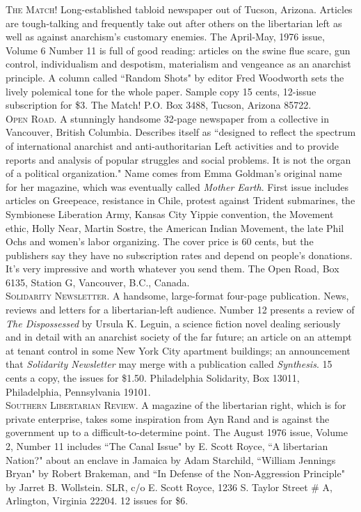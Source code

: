 \noindent\textsc{The Match!} Long-established tabloid newspaper out of Tucson, Arizona. Articles are tough-talking and frequently take out after others on the libertarian left as well as against anarchism's customary enemies. The April-May, 1976 issue, Volume 6 Number 11 is full of good reading: articles on the swine flue scare, gun control, individualism and despotism, materialism and vengeance as an anarchist principle. A column called ``Random Shots" by editor Fred Woodworth sets the lively polemical tone for the whole paper. Sample copy 15 cents, 12-issue subscription for \$3. The Match! P.O. Box 3488, Tucson, Arizona 85722.\\

\noindent\textsc{Open Road.} A stunningly handsome 32-page newspaper from a collective in Vancouver, British Columbia. Describes itself as ``designed to reflect the spectrum of international anarchist and anti-authoritarian Left activities and to provide reports and analysis of popular struggles and social problems. It is not the organ of a political organization." Name comes from Emma Goldman's original name for her magazine, which was eventually called \emph{Mother Earth}. First issue includes articles on Greepeace, resistance in Chile, protest against Trident submarines, the Symbionese Liberation Army, Kansas City Yippie convention, the Movement ethic, Holly Near, Martin Sostre, the American Indian Movement, the late Phil Ochs and women's labor organizing. The cover price is 60 cents, but the publishers say they have no subscription rates and depend on people's donations. It's very impressive and worth whatever you send them. The Open Road, Box 6135, Station G, Vancouver, B.C., Canada.\\

\noindent\textsc{Solidarity Newsletter.} A handsome, large-format four-page publication. News, reviews and letters for a libertarian-left audience. Number 12 presents a review of \emph{The Dispossessed} by Ursula K. Leguin, a science fiction novel dealing seriously and in detail with an anarchist society of the far future; an article on an attempt at tenant control in some New York City apartment buildings; an announcement that \emph{Solidarity Newsletter} may merge with a publication called \emph{Synthesis}. 15 cents a copy, the issues for \$1.50. Philadelphia Solidarity, Box 13011, Philadelphia, Pennsylvania 19101.\\

\noindent\textsc{Southern Libertarian Review.} A magazine of the libertarian right, which is for private enterprise, takes some inspiration from Ayn Rand and is against the government up to a difficult-to-determine point. The August 1976 issue, Volume 2, Number 11 includes ``The Canal Issue" by E. Scott Royce, ``A libertarian Nation?" about an enclave in Jamaica by Adam Starchild, ``William Jennings Bryan" by Robert Brakeman, and ``In Defense of the Non-Aggression Principle" by Jarret B. Wollstein. SLR, c/o E. Scott Royce, 1236 S. Taylor Street \# A, Arlington, Virginia 22204. 12 issues for \$6.\\

